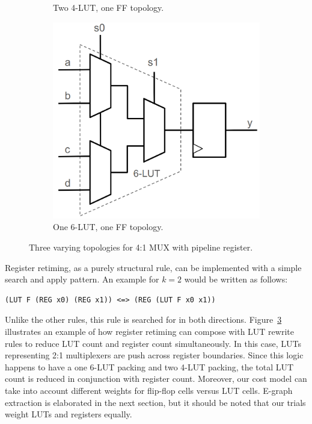 \begin{figure}[tb]
\begin{subfigure}{0.33\textwidth}
        \caption{Two 4-LUT, one FF topology.}\label{fig:retiming:b}
    \end{subfigure}
    \begin{subfigure}{0.33\textwidth}
        \centering
        \includegraphics[width=\textwidth]{img/mux_4_1_retime.png}
        \caption{One 6-LUT, one FF topology.}\label{fig:retiming:c}
    \end{subfigure}
    \caption{Three varying topologies for 4:1 MUX with pipeline register. }\label{fig:retiming}
\end{figure}

Register retiming, as a purely structural rule, can be implemented with a
simple search and apply pattern. An example for $k=2$ would be written as
follows:

\begin{lstlisting}
(LUT F (REG x0) (REG x1)) <=> (REG (LUT F x0 x1))
\end{lstlisting}

Unlike the other rules, this rule is searched for in both directions.
Figure~\ref{fig:retiming} illustrates an example of how register retiming can
compose with LUT rewrite rules to reduce LUT count and register count
simultaneously. In this case, LUTs representing 2:1 multiplexers are push
across register boundaries. Since this logic happens to have a one 6-LUT
packing and two 4-LUT packing, the total LUT count is reduced in conjunction
with register count. Moreover, our cost model can take into account different
weights for flip-flop cells versus LUT cells. E-graph extraction is elaborated
in the next section, but it should be noted that our trials weight LUTs and
registers equally.